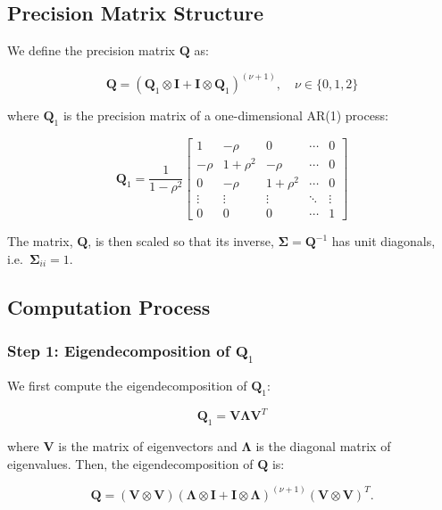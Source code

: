 \documentclass[journal=,manuscript=]{achemso}
\begin{document}
\subsection{Precision Matrix
Structure}\label{precision-matrix-structure}

We define the precision matrix \(\mathbf{Q}\) as:

\[
\mathbf{Q} = (\mathbf{Q}_1 \otimes \mathbf{I} + \mathbf{I} \otimes \mathbf{Q}_1)^{(\nu + 1)}, \quad \nu \in \{0, 1, 2\}
\]

where \(\mathbf{Q}_1\) is the precision matrix of a one-dimensional
AR(1) process:

\[
\mathbf{Q}_1 = \frac{1}{1-\rho^2}
\begin{bmatrix}
1 & -\rho & 0 & \cdots & 0 \\
-\rho & 1+\rho^2 & -\rho & \cdots & 0 \\
0 & -\rho & 1+\rho^2 & \cdots & 0 \\
\vdots & \vdots & \vdots & \ddots & \vdots \\
0 & 0 & 0 & \cdots & 1
\end{bmatrix}
\]

The matrix, \(\mathbf Q\), is then scaled so that its inverse,
\(\mathbf \Sigma = \mathbf Q^{-1}\) has unit diagonals,
i.e.~\(\mathbf \Sigma_{ii} = 1\).

\subsection{Computation Process}\label{computation-process}

\subsubsection{\texorpdfstring{Step 1: Eigendecomposition of
\(\mathbf{Q}_1\)}{Step 1: Eigendecomposition of \textbackslash mathbf\{Q\}\_1}}\label{step-1-eigendecomposition-of-mathbfq_1}

We first compute the eigendecomposition of \(\mathbf{Q}_1\):

\[
\mathbf{Q}_1 = \mathbf{V}\mathbf{\Lambda}\mathbf{V}^T
\]

where \(\mathbf{V}\) is the matrix of eigenvectors and
\(\mathbf{\Lambda}\) is the diagonal matrix of eigenvalues. Then, the
eigendecomposition of \(\mathbf{Q}\) is:

\[
\mathbf{Q} = (\mathbf{V} \otimes \mathbf{V})(\mathbf{\Lambda} \otimes \mathbf{I} + \mathbf{I} \otimes \mathbf{\Lambda})^{(\nu + 1)}(\mathbf{V} \otimes \mathbf{V})^T.
\]
\end{document}
